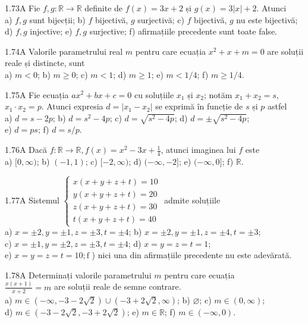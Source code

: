 \documentclass[11pt]{article}
\begin{document}
1.73A Fie $f, g: \mathbb{R} \rightarrow \mathbb{R}$ definite de $f(x)=3 x+2$ și $g(x)=3|x|+2$. Atunci\\ a) $f, g$ sunt bijecții; b) $f$ bijectivă, $g$ surjectivă; c) $f$ bijectivă, $g$ nu este bijectivă; d) $f, g$ injective; e) $f, g$ surjective; f) afirmațiile precedente sunt toate false.

1.74A Valorile parametrului real $m$ pentru care ecuația $x^{2}+x+m=0$ are soluții reale și distincte, sunt\\ a) $m<0$; b) $m \geq 0$; c) $m<1$; d) $m \geq 1$; e) $m<1 / 4$; f) $m \geq 1 / 4$.

1.75A Fie ecuația $a x^{2}+b x+c=0$ cu soluțiile $x_{1}$ și $x_{2}$; notăm $x_{1}+x_{2}=s$, $x_{1} \cdot x_{2}=p$. Atunci expresia $d=\left|x_{1}-x_{2}\right|$ se exprimă în funcție de $s$ și $p$ astfel\\ a) $d=s-2 p$; b) $d=s^{2}-4 p$; c) $d=\sqrt{s^{2}-4 p}$; d) $d= \pm \sqrt{s^{2}-4 p}$;\\ e) $d=p s$; f) $d=s / p$.

1.76A Dacă $f: \mathbb{R} \rightarrow \mathbb{R}, f(x)=x^{2}-3 x+\frac{1}{4}$, atunci imaginea lui $f$ este\\ a) $[0, \infty)$; b) $(-1,1)$; c) $[-2, \infty)$; d) $(-\infty,-2]$; e) $(-\infty, 0]$; f) $\mathbb{R}$.

1.77A Sistemul $\left\{\begin{array}{l}x(x+y+z+t)=10 \\ y(x+y+z+t)=20 \\ z(x+y+z+t)=30 \\ t(x+y+z+t)=40\end{array}\right.$ admite soluțiile\\ a) $x= \pm 2, y= \pm 1, z= \pm 3, t= \pm 4$; b) $x= \pm 2, y= \pm 1, z= \pm 4, t= \pm 3$;\\ c) $x= \pm 1, y= \pm 2, z= \pm 3, t= \pm 4$; d) $x=y=z=t=1$;\\ e) $x=y=z=t=10 ; \mathrm{f}$ ) nici una din afirmațiile precedente nu este adevărată. 

1.78A Determinați valorile parametrului $m$ pentru care ecuația\\ $\frac{x(x+1)}{x+2}=m$ are soluții reale de semne contrare.\\ a) $m \in(-\infty,-3-2 \sqrt{2}) \cup(-3+2 \sqrt{2}, \infty)$; b) $\varnothing$; c) $m \in(0, \infty)$;\\ d) $m \in(-3-2 \sqrt{2},-3+2 \sqrt{2})$; e) $m \in \mathbb{R}$; f) $m \in(-\infty, 0)$.
\end{document}
